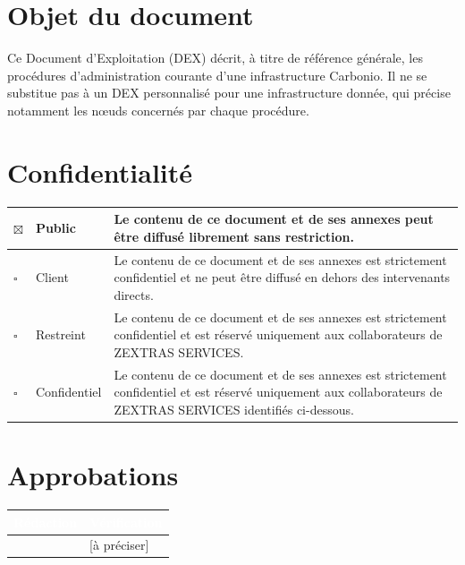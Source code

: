 \documentclass[11pt,a4paper]{report}
\newcommand{\tblhead}[1]{\textcolor{white}{\textbf{#1}}}
\begin{document}
\section{Objet du document}
Ce Document d'Exploitation (DEX) décrit, à titre de référence générale, les procédures d'administration courante d'une infrastructure Carbonio. Il ne se substitue pas à un DEX personnalisé pour une infrastructure donnée, qui précise notamment les nœuds concernés par chaque procédure.

\section{Confidentialité}
\begin{longtable}{|p{1cm}|p{2.5cm}|p{9.5cm}|}
\hline
\endhead
$\boxtimes$ & Public & Le contenu de ce document et de ses annexes peut être diffusé librement sans restriction. \\
\hline
$\square$ & Client & Le contenu de ce document et de ses annexes est strictement confidentiel et ne peut être diffusé en dehors des intervenants directs. \\
\hline
$\square$ & Restreint & Le contenu de ce document et de ses annexes est strictement confidentiel et est réservé uniquement aux collaborateurs de ZEXTRAS SERVICES. \\
\hline
$\square$ & Confidentiel & Le contenu de ce document et de ses annexes est strictement confidentiel et est réservé uniquement aux collaborateurs de ZEXTRAS SERVICES identifiés ci-dessous. \\
\hline
\end{longtable}
\section{Approbations}
\begin{longtable}{|p{6.5cm}|p{6.5cm}|}
\hline
\rowcolor{primary}\tblhead{Rédaction} & \tblhead{Vérification} \\
\hline
\endhead
[à préciser] & [à préciser] \\
\hline
\end{longtable}

\clearpage
\tableofcontents
\clearpage
\end{document}
